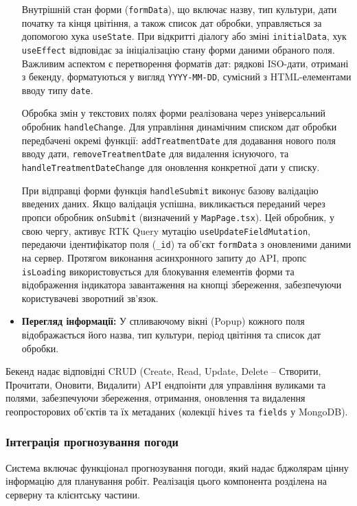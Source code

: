 \begin{itemize}
    Внутрішній стан форми (\texttt{formData}), що включає назву, тип культури, дати початку та кінця цвітіння, а також список дат обробки, управляється за допомогою хука \texttt{useState}. При відкритті діалогу або зміні \texttt{initialData}, хук \texttt{useEffect} відповідає за ініціалізацію стану форми даними обраного поля. Важливим аспектом є перетворення форматів дат: рядкові ISO-дати, отримані з бекенду, форматуються у вигляд \texttt{YYYY-MM-DD}, сумісний з HTML-елементами вводу типу \texttt{date}.
    
    Обробка змін у текстових полях форми реалізована через універсальний обробник \texttt{handleChange}. Для управління динамічним списком дат обробки передбачені окремі функції: \texttt{addTreatmentDate} для додавання нового поля вводу дати, \texttt{removeTreatmentDate} для видалення існуючого, та \texttt{handleTreatmentDateChange} для оновлення конкретної дати у списку. 
    
    При відправці форми функція \texttt{handleSubmit} виконує базову валідацію введених даних. Якщо валідація успішна, викликається переданий через пропси обробник \texttt{onSubmit} (визначений у \texttt{MapPage.tsx}). Цей обробник, у свою чергу, активує RTK Query мутацію \texttt{useUpdateFieldMutation}, передаючи ідентифікатор поля (\texttt{\_id}) та об'єкт \texttt{formData} з оновленими даними на сервер. Протягом виконання асинхронного запиту до API, пропс \texttt{isLoading} використовується для блокування елементів форми та відображення індикатора завантаження на кнопці збереження, забезпечуючи користувачеві зворотний зв'язок.

    \item \textbf{Перегляд інформації:} У спливаючому вікні (Popup) кожного поля відображається його назва, тип культури, період цвітіння та список дат обробки.
\end{itemize}

Бекенд надає відповідні CRUD (Create, Read, Update, Delete – Створити, Прочитати, Оновити, Видалити) API ендпоінти для управління вуликами та полями, забезпечуючи збереження, отримання, оновлення та видалення геопросторових об'єктів та їх метаданих (колекції \texttt{hives} та \texttt{fields} у MongoDB).

\subsubsection{Інтеграція прогнозування погоди}
\label{subsec:weather_integration}
Система включає функціонал прогнозування погоди, який надає бджолярам цінну інформацію для планування робіт. Реалізація цього компонента розділена на серверну та клієнтську частини.

